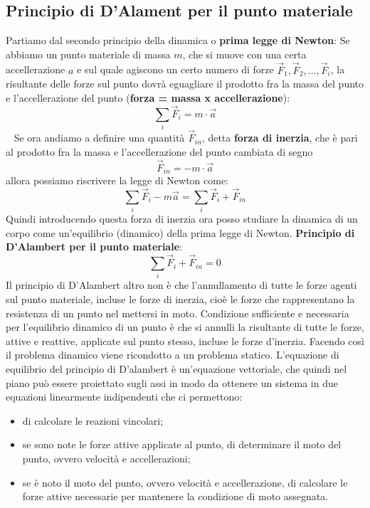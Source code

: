 \subsection{Principio di D'Alament per il punto materiale}
Partiamo dal secondo principio della dinamica o \textbf{prima legge di Newton}:\newline
Se abbiamo un punto materiale di massa $m$, che si muove con una certa accellerazione $a$ e sul quale agiscono un certo numero di forze $\vec{F}_1, \vec{F}_2, \dots, \vec{F}_i$, la risultante delle forze sul punto dovrà eguagliare il prodotto fra la massa del punto e l'accellerazione del punto (\textbf{forza = massa x accellerazione}):
\[
    \sum_{i} \vec{F}_{i} = m \cdot \vec{a}
\]
\ \newline
Se ora andiamo a definire una quantità $\vec{F}_{in}$, detta \textbf{forza di inerzia}, che è pari al prodotto fra la massa e l'accellerazione del punto cambiata di segno
\[
    \vec{F}_{in} = - m \cdot  \vec{a}
\]
allora possiamo riscrivere la legge di Newton come:
\[
    \sum_{i} \vec{F}_i - m \vec{a} = \sum_{i} \vec{F}_{i} + \vec{F}_{in}
\]
Quindi introducendo questa forza di inerzia ora posso studiare la dinamica di un corpo come un'equilibrio (dinamico) della prima legge di Newton.\newline
\newline
\textbf{Principio di D'Alambert per il punto materiale}:
\[
    \sum_{i} \vec{F}_{i} + \vec{F}_{in} = 0
\]
Il principio di D'Alambert altro non è che l'annullamento di tutte le forze agenti sul punto materiale, incluse le forze di inerzia, cioè le forze che rappresentano la resistenza di un punto nel mettersi in moto.\newline
\newline
Condizione sufficiente e necessaria per l'equilibrio dinamico di un punto è che si annulli la risultante di tutte le forze, attive e reattive, applicate sul punto stesso, incluse le forze d'inerzia.\newline
\newline
Facendo così il problema dinamico viene ricondotto a un problema statico.\newline
\newline
L'equazione di equilibrio del principio di D'alambert è un'equazione vettoriale, che quindi nel piano può essere proiettato sugli assi in modo da ottenere un sistema in due equazioni linearmente indipendenti che ci permettono:
\begin{itemize}
    \item di calcolare le reazioni vincolari;
    \item se sono note le forze attive applicate al punto, di determinare il moto del punto, ovvero velocità e accellerazioni;
    \item se è noto il moto del punto, ovvero velocità e accellerazione, di calcolare le forze attive necessarie per mantenere la condizione di moto assegnata.
\end{itemize}
